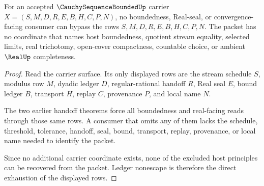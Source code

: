 \begin{theorem}\label{thm:cauchy-sequence-bounded-ledger-nonescape}
For an accepted $\CauchySequenceBoundedUp$ carrier $X=(S,M,D,R,E,B,H,C,P,N)$, no boundedness, Real-seal, or convergence-facing consumer can bypass the rows $S,M,D,R,E,B,H,C,P,N$. The packet has no coordinate that names host boundedness, quotient stream equality, selected limits, real trichotomy, open-cover compactness, countable choice, or ambient $\RealUp$ completeness.
\end{theorem}
\begin{proof}
Read the carrier surface. Its only displayed rows are the stream schedule $S$, modulus row $M$, dyadic ledger $D$, regular-rational handoff $R$, Real seal $E$, bound ledger $B$, transport $H$, replay $C$, provenance $P$, and local name $N$.

The two earlier handoff theorems force all boundedness and real-facing reads through those same rows. A consumer that omits any of them lacks the schedule, threshold, tolerance, handoff, seal, bound, transport, replay, provenance, or local name needed to identify the packet.

Since no additional carrier coordinate exists, none of the excluded host principles can be recovered from the packet. Ledger nonescape is therefore the direct exhaustion of the displayed rows.
\end{proof}

